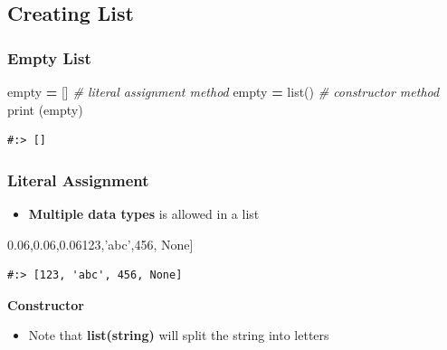 \documentclass[
]{book}
\newenvironment{Shaded}{\begin{snugshade}}{\end{snugshade}}
\newcommand{\BuiltInTok}[1]{#1}
\newcommand{\CommentTok}[1]{\textcolor[rgb]{0.37,0.37,0.37}{\textit{#1}}}
\newcommand{\DecValTok}[1]{\textcolor[rgb]{0.06,0.06,0.06}{#1}}
\newcommand{\NormalTok}[1]{#1}
\newcommand{\OperatorTok}[1]{\textcolor[rgb]{0.43,0.43,0.43}{\textbf{#1}}}
\newcommand{\StringTok}[1]{\textcolor[rgb]{0.5,0.5,0.5}{#1}}
\newcommand{\VariableTok}[1]{\textcolor[rgb]{0,0,0}{#1}}
\providecommand{\tightlist}{%
  \setlength{\itemsep}{0pt}\setlength{\parskip}{0pt}}
\begin{document}
\hypertarget{creating-list}{%
\subsection{Creating List}\label{creating-list}}

\hypertarget{empty-list}{%
\subsubsection{Empty List}\label{empty-list}}

\begin{Shaded}
\begin{Highlighting}[]
\NormalTok{empty }\OperatorTok{=}\NormalTok{ []      }\CommentTok{# literal assignment method}
\NormalTok{empty }\OperatorTok{=} \BuiltInTok{list}\NormalTok{()  }\CommentTok{# constructor method}
\BuiltInTok{print}\NormalTok{ (empty)}
\end{Highlighting}
\end{Shaded}

\begin{verbatim}
#:> []
\end{verbatim}

\hypertarget{literal-assignment}{%
\subsubsection{Literal Assignment}\label{literal-assignment}}

\begin{itemize}
\tightlist
\item
  \textbf{Multiple data types} is allowed in a list
\end{itemize}

\begin{Shaded}
\begin{Highlighting}[]
\NormalTok{[}\DecValTok{123}\NormalTok{,}\StringTok{'abc'}\NormalTok{,}\DecValTok{456}\NormalTok{, }\VariableTok{None}\NormalTok{]}
\end{Highlighting}
\end{Shaded}

\begin{verbatim}
#:> [123, 'abc', 456, None]
\end{verbatim}

\textbf{Constructor}

\begin{itemize}
\tightlist
\item
  Note that \textbf{list(string)} will split the string into letters
\end{itemize}
\end{document}
